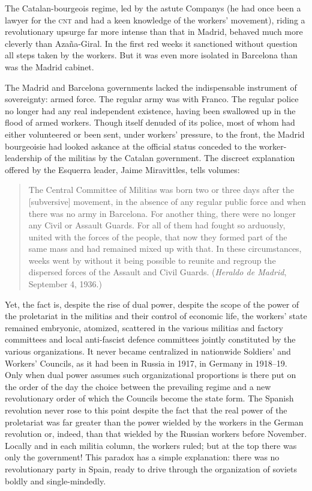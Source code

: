 The Catalan-bourgeois regime, led by the astute Companys (he had once been a lawyer for the \textsc{cnt} and had a keen knowledge of the workers’ movement), riding a revolutionary upsurge far more intense than that in Madrid, behaved much more cleverly than Azaña-Giral. In the first red weeks it sanctioned without question all steps taken by the workers. But it was even more isolated in Barcelona than was the Madrid cabinet.

The Madrid and Barcelona governments lacked the indispensable instrument of sovereignty: armed force. The regular army was with Franco. The regular police no longer had any real independent existence, having been swallowed up in the flood of armed workers. Though itself denuded of its police, most of whom had either volunteered or been sent, under workers’ pressure, to the front, the Madrid bourgeoisie had looked askance at the official status conceded to the worker-leadership of the militias by the Catalan government. The discreet explanation offered by the Esquerra leader, Jaime Miravittles, tells volumes:
\begin{quote}
  The Central Committee of Militias was born two or three days after the [subversive] movement, in the absence of any regular public force and when there was no army in Barcelona. For another thing, there were no longer any Civil or Assault Guards. For all of them had fought so arduously, united with the forces of the people, that now they formed part of the same mass and had remained mixed up with that. In these circumstances, weeks went by without it being possible to reunite and regroup the dispersed forces of the Assault and Civil Guards. (\emph{Heraldo de Madrid}, September 4, 1936.)
\end{quote}
Yet, the fact is, despite the rise of dual power, despite the scope of the power of the proletariat in the militias and their control of economic life, the workers’ state remained embryonic, atomized, scattered in the various militias and factory committees and local anti-fascist defence committees jointly constituted by the various organizations. It never became centralized in nationwide Soldiers’ and Workers’ Councils, as it had been in Russia in 1917, in Germany in 1918–19. Only when dual power assumes such organizational proportions is there put on the order of the day the choice between the prevailing regime and a new revolutionary order of which the Councils become the state form. The Spanish revolution never rose to this point despite the fact that the real power of the proletariat was far greater than the power wielded by the workers in the German revolution or, indeed, than that wielded by the Russian workers before November. Locally and in each militia column, the workers ruled; but at the top there was only the government! This paradox has a simple explanation: there was no revolutionary party in Spain, ready to drive through the organization of soviets boldly and single-mindedly.

